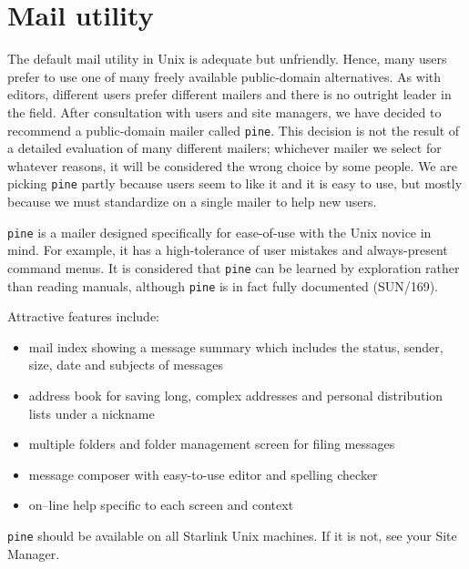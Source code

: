 \section{Mail utility}

The default mail utility in Unix is adequate but unfriendly. Hence, many users
prefer to use one of many freely available public-domain alternatives. As
with editors, different users prefer different mailers and there is no outright
leader in the field. After consultation with users and site managers, we have
decided to recommend a public-domain mailer called \verb|pine|.
This decision is not the result of a detailed evaluation of many different
mailers; whichever mailer we select for whatever reasons, it will be considered
the wrong choice by some people. We are picking \verb|pine|  partly because
users seem to like it and it is easy to use, but mostly because we  must
standardize on a single mailer to help new users.

\verb|pine| is a mailer designed specifically for ease-of-use with
the Unix novice in mind. For example, it has a high-tolerance of user mistakes
and always-present command menus. It is considered that \verb|pine| can be
learned by exploration rather than reading manuals, although \verb|pine| is in
fact fully documented (SUN/169).

Attractive features include:

\begin{itemize}

\item mail index showing a message summary which includes the status, sender,
size, date and subjects of messages

\item address book for saving long, complex addresses and personal 
distribution lists under a nickname

\item multiple folders and folder management screen for filing messages

\item message composer with easy-to-use editor and spelling checker

\item on--line help specific to each screen and context

\end{itemize}

\verb|pine| should be available on all Starlink Unix machines. If it is not, see your
Site Manager. 


